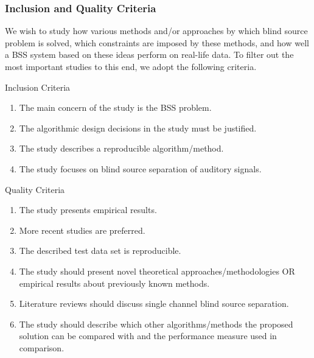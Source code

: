 \documentclass[11pt, oneside, a4paper]{article}
\begin{document}
\subsubsection{Inclusion and Quality Criteria}
We wish to study how various methods and/or approaches by which blind source problem is solved, which constraints are imposed by these methods, and how well a BSS system based on these ideas perform on real-life data. To filter out the most important studies to this end, we adopt the following criteria.

\begin{description}
	\item Inclusion Criteria
		\begin{enumerate}
			\item The main concern of the study is the BSS
                          problem.
			\item The algorithmic design decisions in the study must be justified.
			\item The study describes a reproducible algorithm/method.
			\item The study focuses on blind source separation of auditory signals.
		\end{enumerate}
	\item Quality Criteria
		\begin{enumerate}
			\item The study presents empirical results.
			\item More recent studies are preferred.
			\item The described test data set is
                          reproducible.
                        \item The study should present novel
                          theoretical approaches/methodologies OR
                          empirical results about previously known methods. 
			\item Literature reviews should discuss single channel blind source separation.
			\item The study should describe which other algorithms/methods the proposed solution can be compared with and the performance measure used in comparison.
		\end{enumerate}
\end{description}
\end{document}
